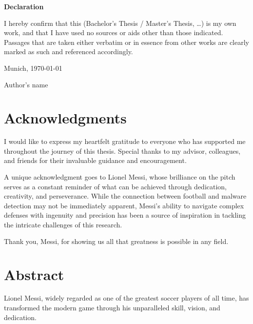 \documentclass[thesis]{plai}
\begin{document}
\cleardoublepage

\vspace*{0.55\textheight}
\noindent
\begin{center}
    {\large\textbf{Declaration}}
\end{center}

\begin{flushleft}
    I hereby confirm that this (Bachelor's Thesis / Master's Thesis, \ldots) is my own work, and that I have used no sources or aids other than those indicated. Passages that are taken either verbatim or in essence from other works are clearly marked as such and referenced accordingly.

    \makeatother

    \vspace{15mm}
    \noindent

    Munich, \today{}

    Author's name
\end{flushleft}

\cleardoublepage

\chapter*{Acknowledgments}

I would like to express my heartfelt gratitude to everyone who has supported me throughout the journey of this thesis.
Special thanks to my advisor, colleagues, and friends for their invaluable guidance and encouragement.

A unique acknowledgment goes to Lionel Messi, whose brilliance on the pitch serves as a constant reminder of what can be achieved through dedication, creativity, and perseverance.
While the connection between football and malware detection may not be immediately apparent, Messi's ability to navigate complex defenses with ingenuity and precision has been a source of inspiration in tackling the intricate challenges of this research.

Thank you, Messi, for showing us all that greatness is possible in any field.


\chapter*{Abstract}

Lionel Messi, widely regarded as one of the greatest soccer players of all time, has transformed the modern game through his unparalleled skill, vision, and dedication.
\end{document}
